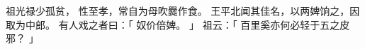 
\switchcolumn*[\section{}]

祖光禄少孤贫，
性至孝，常自为母吹爨作食。
王平北闻其佳名，以两婢饷之，因取为中郎。
有人戏之者曰：「
    奴价倍婢。
」
祖云：「
    百里奚亦何必轻于五之皮邪？
」

\switchcolumn



